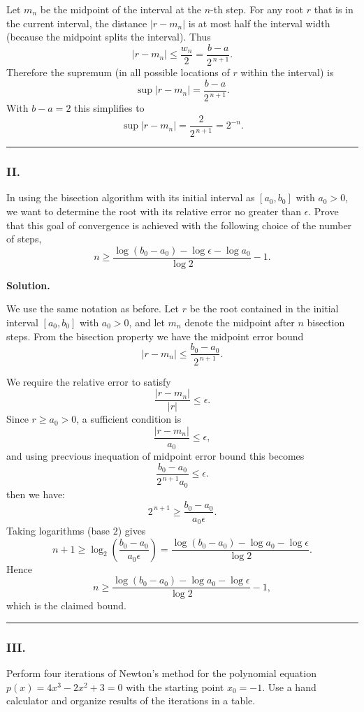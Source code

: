 \documentclass[a4paper]{article}
\begin{document}
Let $m_n$ be the midpoint of the interval at the $n$-th step. For any root \(r\) that is in the current interval, the distance \(|r-m_n|\) is at most half the interval width (because the midpoint splits the interval). Thus
\[
|r-m_n|\le \frac{w_n}{2}=\frac{b-a}{2^{\,n+1}}.
\]
Therefore the supremum (in all possible locations of \(r\) within the interval) is
\[
\boxed{\sup |r-m_n|=\frac{b-a}{2^{\,n+1}}.}
\]
With $b-a=2$ this simplifies to
\[
\boxed{\sup |r-m_n|=\frac{2}{2^{\,n+1}}=2^{-n}.}
\]





\noindent\rule{\textwidth}{.4pt}


\subsubsection*{II.}
In using the bisection algorithm with its initial interval as $[a_0, b_0]$ with $a_0 > 0$, we want to determine the root with its relative error no greater than $\epsilon$. Prove that this goal of convergence is achieved with the following choice of the number of steps,
    \[
    n \ge \frac{\log(b_0 - a_0) - \log\epsilon - \log a_0}{\log 2} - 1.
    \]

\textbf{Solution.}

We use the same notation as before. Let $r$ be the root contained in the initial interval $[a_0,b_0]$ with $a_0>0$, and let $m_n$ denote the midpoint after $n$ bisection steps. From the bisection property we have the midpoint error bound
\[
|r-m_n|\le \frac{b_0-a_0}{2^{\,n+1}}.
\]

We require the relative error to satisfy
\[
\frac{|r-m_n|}{|r|}\le \epsilon.
\]
Since $r\ge a_0>0$, a sufficient condition is
\[
\frac{|r-m_n|}{a_0}\le \epsilon,
\]
and using precvious inequation of midpoint error bound this becomes
\[
\frac{b_0-a_0}{2^{\,n+1}a_0}\le \epsilon.
\]
then we have:
\[
2^{\,n+1}\ge \frac{b_0-a_0}{a_0\epsilon}.
\]
Taking logarithms (base $2$) gives
\[
n+1 \ge \log_2\!\left(\frac{b_0-a_0}{a_0\epsilon}\right)
= \frac{\log(b_0-a_0)-\log a_0 - \log\epsilon}{\log 2}.
\]
Hence
\[
n \ge \frac{\log(b_0-a_0)-\log a_0 - \log\epsilon}{\log 2} - 1,
\]
which is the claimed bound. 


\noindent\rule{\textwidth}{.4pt}

\subsubsection*{III.}
Perform four iterations of Newton's method for the polynomial equation $p(x) = 4x^3 - 2x^2 + 3 = 0$ with the starting point $x_0 = -1$. Use a hand calculator and organize results of the iterations in a table.
\end{document}
